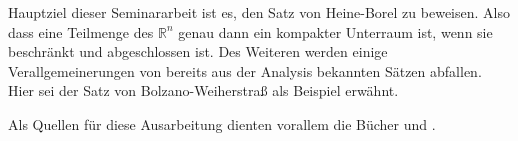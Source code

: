 Hauptziel dieser Seminararbeit ist es, den Satz von Heine-Borel zu beweisen. Also dass eine Teilmenge des
\(\mathbb{R}^n\) genau dann ein kompakter Unterraum ist, wenn sie beschränkt und abgeschlossen ist.
Des Weiteren werden einige Verallgemeinerungen von bereits aus der Analysis bekannten Sätzen abfallen.
Hier sei der Satz von Bolzano-Weiherstraß als Beispiel erwähnt.

Als Quellen für diese Ausarbeitung dienten vorallem die Bücher \cite{book:broeker} und \cite{book:jaenich}.
%
%

